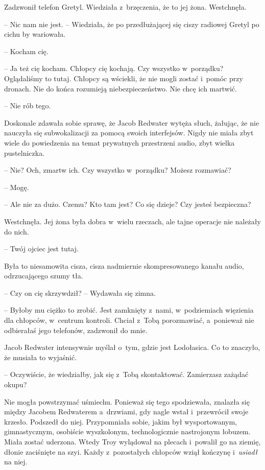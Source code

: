 \documentclass[oneside,polish,11pt,sfheadings]{mwbk}
\begin{document}
Zadzwonił telefon Gretyl. Wiedziała z~brzęczenia, że to jej żona.
Westchnęła.

-- Nic nam nie jest. -- Wiedziała, że po przedłużającej się ciszy radiowej
Gretyl po cichu by wariowała.

-- Kocham cię.

-- Ja też cię kocham. Chłopcy cię kochają. Czy wszystko w~porządku?
Oglądaliśmy to tutaj. Chłopcy są wściekli, że nie mogli zostać i~pomóc
przy dronach. Nie do końca rozumieją niebezpieczeństwo. Nie chcę ich
martwić.

-- Nie rób tego.

 Doskonale zdawała sobie sprawę, że Jacob Redwater
wytęża słuch, żałując, że nie nauczyła się subwokalizacji za pomocą
swoich interfejsów. Nigdy nie miała zbyt wiele do powiedzenia na temat
prywatnych przestrzeni audio, zbyt wielka pustelniczka.

-- Nie? Och, zmartw ich. Czy wszystko w~porządku? Możesz rozmawiać?

-- Mogę.

-- Ale nie za dużo. Czemu? Kto tam jest? Co się dzieje? Czy jesteś
bezpieczna?

Westchnęła. Jej żona była dobra w~wielu rzeczach, ale tajne operacje nie
należały do nich.

-- Twój ojciec jest tutaj.

Była to niesamowita cisza, cisza nadmiernie skompresowanego kanału
audio, odrzucającego szumy tła. 

-- Czy on cię skrzywdził? -- Wydawała się
zimna.

-- Byłoby mu ciężko to zrobić. Jest zamknięty z~nami, w~podziemiach
więzienia dla chłopców, w~centrum kontroli. Chciał z~Tobą porozmawiać, a~ponieważ nie odbierałaś jego telefonów, zadzwonił do mnie.

Jacob Redwater intensywnie myślał o~tym, gdzie jest Lodołasica. Co to
znaczyło, że musiała to wyjaśnić.

-- Oczywiście, że wiedziałby, jak się z~Tobą skontaktować. Zamierzasz
zażądać okupu?

Nie mogła powstrzymać uśmiechu. Ponieważ się tego spodziewała, znalazła
się między Jacobem Redwaterem a~drzwiami, gdy nagle wstał i~przewrócił
swoje krzesło. Podszedł do niej. Przypomniała sobie, jakim był
wysportowanym, gimnastycznym, osobiście wyszkolonym, technologicznie
nastrojonym łobuzem. Miała zostać uderzona. Wtedy Troy wylądował na
plecach i~powalił go na ziemię, dłonie zaciśnięte na szyi. Każdy z~pozostałych chłopców wziął kończynę i~\textit{usiadł }na niej.
\end{document}
